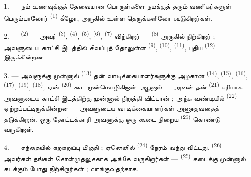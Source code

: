 \VUsaut{3.0mm}

1. --- நம் உணவுக்குத் தேவையான பொருள்களை நமக்குத் தரும் வணிகர்களுள்
பெரும்பாலோர்  
\textsuperscript{(1)} கீழோ, அருகில் உள்ள தெருக்களிலோ கூடுகிறார்கள்.

2. ---  \textsuperscript{(2)} —
அவர்  \textsuperscript{(3)},
 \textsuperscript{(4)},  \textsuperscript{(5)}, 
\textsuperscript{(6)}, 
\textsuperscript{(7)} விற்கிறார் —  \textsuperscript{(8)} அருகில் நிற்கிறார் ; அவளுடைய
காட்சி இடத்தில் சிவப்புத் தோலுள்ள 
\textsuperscript{(9)}, 
\textsuperscript{(10)}, 
\textsuperscript{(11)}, புதிய 
\textsuperscript{(12)} இருக்கின்றன.

3. --- அவளுக்கு முன்னால் 
\textsuperscript{(13)} தன் வாடிக்கையாளர்களுக்கு அழகான
 \textsuperscript{(14)}, 
\textsuperscript{(15)},  \textsuperscript{(16)},
 \textsuperscript{(17)},
 \textsuperscript{(19)},
 \textsuperscript{(18)}, ஏன்
 \textsuperscript{(20)} கூட முன்மொழிகிறாள்.
ஆனால்  — அவன் தன் 
\textsuperscript{(21)} சரியாக அவளுடைய காட்சி இடத்திற்கு முன்னால்
நிறுத்தி விட்டான் ; அந்த வண்டியில் 
\textsuperscript{(22)} ஏற்றப்பட்டிருக்கின்றன — அவளுடைய வாடிக்கையாளர்கள் அணுகுவதைத்
தடுக்கிறான். ஒரு தோட்டக்காரி அவளுக்கு ஒரு கூடை நிறைய
 \textsuperscript{(23)} கொண்டு வருகிறாள்.

\VUsaut{4.0mm}
\VUsaut{3.0mm}

4. --- சந்தையில் சுறுசுறுப்பு மிகுதி ; ஏனெனில்  \textsuperscript{(24)} நேரம் வந்து விட்டது.
 \textsuperscript{(26)} — அவர்கள் தங்கள்
கொள்முதலுக்காக அங்கே வருகிறார்கள் — 
\textsuperscript{(25)} கடைக்கு முன்னால் கடக்கும் போது
நிற்கிறார்கள் ;   வாங்குவதற்காக.

